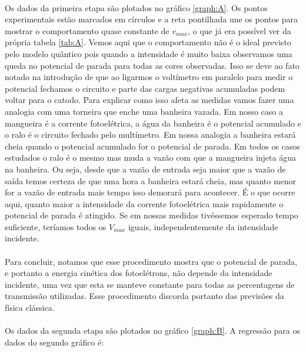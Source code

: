 \documentclass[a4paper,11pt]{article}
\begin{document}
\paragraph{} Os dados da primeira etapa são plotados no
gráfico \ref{graph:A}. Os pontos experimentais
estão marcados em círculos e a reta pontilhada une os pontos
para mostrar o comportamento quase constante de
$v_{max}$, o que já era possível ver da própria tabela
\ref{tab:A}. Vemos aqui que o comportamento não é o ideal
previsto pelo modelo quântico pois quando a intensidade é
muito baixa observamos uma queda no potencial de parada para
todas as cores observadas. Isso se deve ao fato notado
na introdução de que ao ligarmos o voltímetro em paralelo
para medir o potencial fechamos o circuito e parte das
cargas negativas acumuladas podem voltar para o catodo. Para
explicar como isso afeta as medidas vamos fazer uma analogia 
com uma torneira que enche uma banheira vazada. Em nosso
caso a mangueira é a corrente fotoelétrica, a água da
banheira é o potencial acumulado e o ralo é o circuito
fechado pelo multímetro. Em nossa analogia a banheira estará
cheia quando o potencial acumulado for o potencial de
parada. Em todos os casos estudados o ralo é o mesmo mas
muda a vazão com que a mangueira injeta água na banheira. Ou
seja, desde que a vazão de entrada seja maior que a vazão de
saída temos certeza de que uma hora a banheira estará cheia,
mas quanto menor for a vazão de entrada mais tempo isso
demorará para acontecer. É o que ocorre aqui, quanto maior a
intensidade da corrente fotoelétrica mais rapidamente o
potencial de parada é atingido. Se em nossas medidas
tivéssemos esperado tempo suficiente,  teríamos todos os
$V_{max}$ iguais, independentemente da intensidade
incidente.

\paragraph{}Para concluir, notamos que esse procedimento
mostra que o potencial de parada, e portanto a energia
cinética dos fotoelétrons, não depende da intensidade
incidente, uma vez que esta se manteve constante para
todas as percentagens de transmissão utilizadas. Esse
procedimento discorda portanto das previsões da física
clássica.



\paragraph{}Os dados da segunda etapa são plotados no gráfico
\ref{graph:B}. A regressão para os dados do segundo gráfico 
é:
\end{document}
